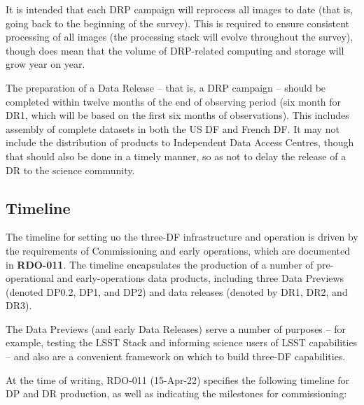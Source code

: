 It is intended that each DRP campaign will reprocess all images to date (that is, going back to the beginning of the survey). This is required to ensure consistent processing of all images (the processing stack will evolve throughout the survey), though does mean that the volume of DRP-related computing and storage will grow year on year.

The preparation of a Data Release – that is, a DRP campaign – should be completed within twelve months of the end of observing period (six month for DR1, which will be based on the first six months of observations). This includes assembly of complete datasets in both the US DF and French DF. It may not include the distribution of products to Independent Data Access Centres, though that should also be done in a timely manner, so as not to delay the release of a DR to the science community.

\subsection{Timeline}

The timeline for setting uo the three-DF infrastructure and operation is driven by the requirements of Commissioning and early operations, which are documented in {\bf RDO-011}. The timeline encapsulates the production of a number of pre-operational and early-operations data products, including three Data Previews (denoted DP0.2, DP1, and DP2) and data releases (denoted by DR1, DR2, and DR3).

The Data Previews (and early Data Releases) serve a number of purposes -- for example, testing the LSST Stack and informing science users of LSST capabilities -- and also are a convenient framework on which to build three-DF capabilities.

At the time of writing, RDO-011 (15-Apr-22) specifies the following
timeline for DP and DR production, as well as indicating the
milestones for commissioning:


